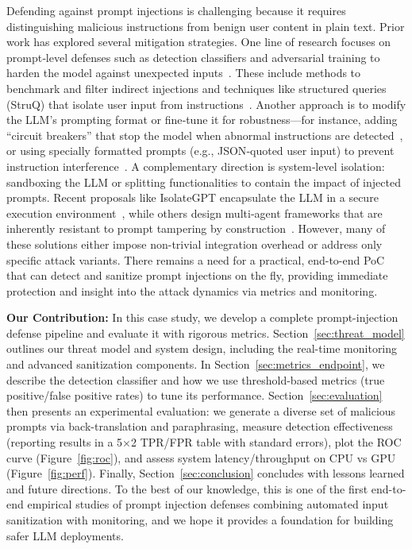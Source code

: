 \documentclass[conference]{IEEEtran}
\begin{document}
Defending against prompt injections is challenging because it requires distinguishing malicious instructions from benign user content in plain text. Prior work has explored several mitigation strategies. One line of research focuses on prompt‐level defenses such as detection classifiers and adversarial training to harden the model against unexpected inputs~\cite{Yi2023,Chen2024}. These include methods to benchmark and filter indirect injections and techniques like structured queries (StruQ) that isolate user input from instructions~\cite{Chen2024}. Another approach is to modify the LLM’s prompting format or fine‐tune it for robustness—for instance, adding “circuit breakers” that stop the model when abnormal instructions are detected~\cite{Zou2024}, or using specially formatted prompts (e.g., JSON‐quoted user input) to prevent instruction interference~\cite{Willison2022}. A complementary direction is system‐level isolation: sandboxing the LLM or splitting functionalities to contain the impact of injected prompts. Recent proposals like IsolateGPT encapsulate the LLM in a secure execution environment~\cite{Wu2025}, while others design multi‐agent frameworks that are inherently resistant to prompt tampering by construction~\cite{Debenedetti2025}. However, many of these solutions either impose non-trivial integration overhead or address only specific attack variants. There remains a need for a practical, end-to-end PoC that can detect and sanitize prompt injections on the fly, providing immediate protection and insight into the attack dynamics via metrics and monitoring.

\textbf{Our Contribution:} In this case study, we develop a complete prompt-injection defense pipeline and evaluate it with rigorous metrics. Section~\ref{sec:threat_model} outlines our threat model and system design, including the real-time monitoring and advanced sanitization components. In Section~\ref{sec:metrics_endpoint}, we describe the detection classifier and how we use threshold-based metrics (true positive/false positive rates) to tune its performance. Section~\ref{sec:evaluation} then presents an experimental evaluation: we generate a diverse set of malicious prompts via back-translation and paraphrasing, measure detection effectiveness (reporting results in a 5×2 TPR/FPR table with standard errors), plot the ROC curve (Figure~\ref{fig:roc}), and assess system latency/throughput on CPU vs GPU (Figure~\ref{fig:perf}). Finally, Section~\ref{sec:conclusion} concludes with lessons learned and future directions. To the best of our knowledge, this is one of the first end-to-end empirical studies of prompt injection defenses combining automated input sanitization with monitoring, and we hope it provides a foundation for building safer LLM deployments.
\end{document}
